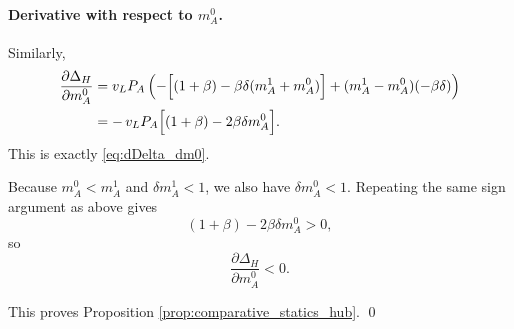 \paragraph{Derivative with respect to $m_A^0$.}
Similarly,
\begin{align}
\frac{\partial \Delta_H}{\partial m_A^0}
&=
v_L P_A
\left(
-\Bigl[(1+\beta)-\beta\delta(m_A^1+m_A^0)\Bigr]
+
(m_A^1-m_A^0)(-\beta\delta)
\right)
\nonumber\\
&=
-\,v_L P_A\Bigl[(1+\beta)-2\beta\delta m_A^0\Bigr].
\label{eq:app4_dDelta_dm0_raw}
\end{align}
This is exactly \eqref{eq:dDelta_dm0}.

Because $m_A^0<m_A^1$ and $\delta m_A^1<1$, we also have $\delta m_A^0<1$. Repeating the same sign argument as above gives
\[
(1+\beta)-2\beta\delta m_A^0>0,
\]
so
\begin{equation}
\frac{\partial \Delta_H}{\partial m_A^0}<0.
\label{eq:app4_dDelta_dm0_sign}
\end{equation}

This proves Proposition \ref{prop:comparative_statics_hub}.
\qed
